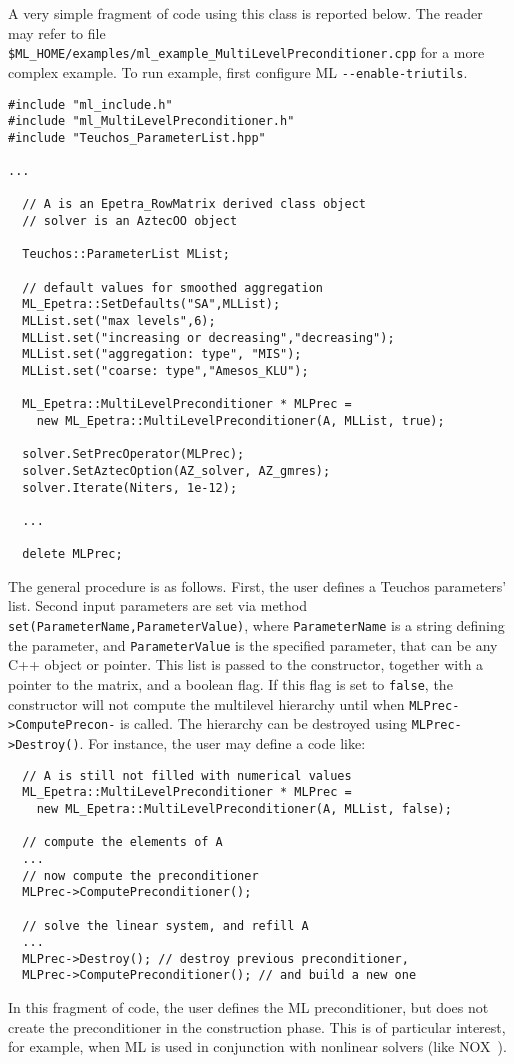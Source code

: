 A very simple fragment of code using this class is reported below.
The reader may refer to file
\verb!$ML_HOME/examples/ml_example_MultiLevelPreconditioner.cpp! for a more
complex example. To run example, first 
configure ML \verb!--enable-triutils!.
\begin{verbatim}
#include "ml_include.h"
#include "ml_MultiLevelPreconditioner.h"
#include "Teuchos_ParameterList.hpp"

...

  // A is an Epetra_RowMatrix derived class object
  // solver is an AztecOO object

  Teuchos::ParameterList MList;

  // default values for smoothed aggregation
  ML_Epetra::SetDefaults("SA",MLList);
  MLList.set("max levels",6);
  MLList.set("increasing or decreasing","decreasing");
  MLList.set("aggregation: type", "MIS");
  MLList.set("coarse: type","Amesos_KLU");
  
  ML_Epetra::MultiLevelPreconditioner * MLPrec = 
    new ML_Epetra::MultiLevelPreconditioner(A, MLList, true);

  solver.SetPrecOperator(MLPrec);
  solver.SetAztecOption(AZ_solver, AZ_gmres);
  solver.Iterate(Niters, 1e-12);

  ...

  delete MLPrec;
\end{verbatim}
The general procedure is as follows. First, the user defines a Teuchos
parameters' list. Second input parameters are set via method
\verb!set(ParameterName,ParameterValue)!, where \verb!ParameterName! is
a string defining the parameter, and \verb!ParameterValue! is the
specified parameter, that can be any C++ object or pointer.  This list
is passed to the constructor, together with a pointer to the matrix, and
a boolean flag.  If this flag is set to \verb!false!, the constructor
will not compute the multilevel hierarchy until when
{\tt MLPrec->ComputePrecon-} is called. The hierarchy can be
destroyed using \verb!MLPrec->Destroy()!.  For instance, the user may
define a code like:
\begin{verbatim}
  // A is still not filled with numerical values
  ML_Epetra::MultiLevelPreconditioner * MLPrec = 
    new ML_Epetra::MultiLevelPreconditioner(A, MLList, false);
  
  // compute the elements of A
  ...
  // now compute the preconditioner
  MLPrec->ComputePreconditioner();

  // solve the linear system, and refill A
  ...
  MLPrec->Destroy(); // destroy previous preconditioner,
  MLPrec->ComputePreconditioner(); // and build a new one
\end{verbatim}
In this fragment of code, the user defines the ML preconditioner, but
does not create the preconditioner in the construction phase. This is of
particular interest, for example, when ML is used in conjunction with
nonlinear solvers (like NOX~\cite{NOX-home-page}).

